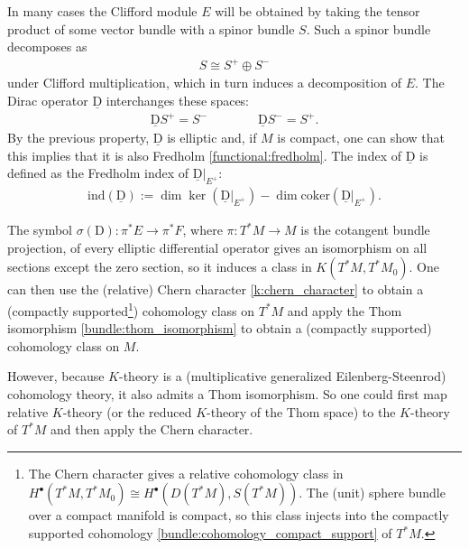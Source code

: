     \begin{definition}[Index]
        In many cases the Clifford module $E$ will be obtained by taking the tensor product of some vector bundle with a spinor bundle $S$. Such a spinor bundle decomposes as
        \begin{gather}
            S\cong S^+\oplus S^-
        \end{gather}
        under Clifford multiplication, which in turn induces a decomposition of $E$. The Dirac operator $\underline{\mathrm{D}}$ interchanges these spaces:
        \begin{gather}
            \underline{\mathrm{D}}S^+=S^-\qquad\qquad\underline{\mathrm{D}}S^-=S^+.
        \end{gather}
        By the previous property, $\underline{\mathrm{D}}$ is elliptic and, if $M$ is compact, one can show that this implies that it is also Fredholm \ref{functional:fredholm}. The index of $\underline{\mathrm{D}}$ is defined as the Fredholm index of $\underline{\mathrm{D}}|_{E^+}$:
        \begin{gather}
            \mathrm{ind}(\underline{\mathrm{D}}) := \dim\ker(\underline{\mathrm{D}}|_{E^+})-\dim\mathrm{coker}(\underline{\mathrm{D}}|_{E^+}).
        \end{gather}
    \end{definition}

    The symbol $\sigma(\mathrm{D}):\pi^*E\rightarrow\pi^*F$, where $\pi:T^*M\rightarrow M$ is the cotangent bundle projection, of every elliptic differential operator gives an isomorphism on all sections except the zero section, so it induces a class in $K(T^*M,T^*M_0)$. One can then use the (relative) Chern character \ref{k:chern_character} to obtain a (compactly supported\footnote{The Chern character gives a relative cohomology class in $H^\bullet(T^*M,T^*M_0)\cong H^\bullet(D(T^*M),S(T^*M))$. The (unit) sphere bundle over a compact manifold is compact, so this class injects into the compactly supported cohomology \ref{bundle:cohomology_compact_support} of $T^*M$.}) cohomology class on $T^*M$ and apply the Thom isomorphism \ref{bundle:thom_isomorphism} to obtain a (compactly supported) cohomology class on $M$.

    However, because $K$-theory is a (multiplicative generalized Eilenberg-Steenrod) cohomology theory, it also admits a Thom isomorphism. So one could first map relative $K$-theory (or the reduced $K$-theory of the Thom space) to the $K$-theory of $T^*M$ and then apply the Chern character.


